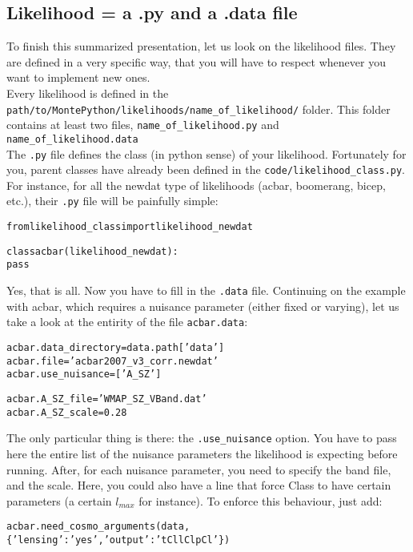 \documentclass[10pt]{article}
\begin{document}
  \subsection{Likelihood = a .py and a .data file\label{ssec:lkl}}

  To finish this summarized presentation, let us look on the likelihood files.
  They are defined in a very specific way, that you will have to respect
  whenever you want to implement new ones.\\

  Every likelihood is defined in the
  \verb?path/to/MontePython/likelihoods/name_of_likelihood/?
  folder. This folder contains at least two files, \verb?name_of_likelihood.py?
  and \verb?name_of_likelihood.data?\\

  The \verb?.py? file defines the class (in python sense) of your likelihood.
  Fortunately for you, parent classes have already been defined in the
  \verb?code/likelihood_class.py?. For instance, for all the newdat type of
  likelihoods (acbar, boomerang, bicep, etc.), their \verb?.py? file will be
  painfully simple:

  \begin{alltt}
  from likelihood_class import likelihood_newdat

  class acbar(likelihood_newdat):
    pass
  \end{alltt}

  Yes, that is all. Now you have to fill in the \verb?.data? file. Continuing
  on the example with acbar, which requires a nuisance parameter (either fixed
  or varying), let us take a look at the entirity of the file
  \verb?acbar.data?:
  
  \begin{alltt}
    acbar.data_directory = data.path['data']
    acbar.file           = 'acbar2007_v3_corr.newdat'
    acbar.use_nuisance   = ['A_SZ']

    acbar.A_SZ_file      = 'WMAP_SZ_VBand.dat'
    acbar.A_SZ_scale     = 0.28
  \end{alltt}

  The only particular thing is there: the \verb?.use_nuisance? option. You have
  to pass here the entire list of the nuisance parameters the likelihood is
  expecting before running. After, for each nuisance parameter, you need to
  specify the band file, and the scale. Here, you could also have a line that
  force Class to have certain parameters (a certain $l_{max}$ for instance). To
  enforce this behaviour, just add:
  \begin{alltt}
    acbar.need_cosmo_arguments(data,\{'lensing':'yes', 'output':'tCl lCl pCl'\})
  \end{alltt}
\end{document}
